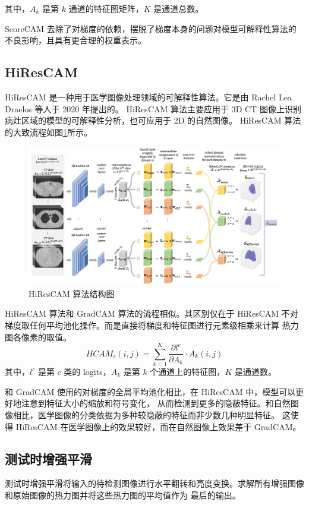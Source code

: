 \documentclass[supercite]{Experimental_Report}
\theoremstyle{definition}
\begin{document}
其中，$A_k$ 是第 $k$ 通道的特征图矩阵，$K$ 是通道总数。

ScoreCAM 去除了对梯度的依赖，摆脱了梯度本身的问题对模型可解释性算法的不良影响，且具有更合理的权重表示。

\subsection{HiResCAM}
HiResCAM\cite{HiResCAM} 是一种用于医学图像处理领域的可解释性算法。它是由 Rachel Lea Draelos 等人于 2020 年提出的。
HiResCAM 算法主要应用于 3D CT 图像上识别病灶区域的模型的可解释性分析，也可应用于 2D 的自然图像。
HiResCAM 算法的大致流程如图\ref{HiResCAM}所示。
\begin{figure}[H]
	\begin{center}
		\includegraphics[scale=0.8]{../images/HiResCAM算法结构图.png}
		\caption{HiResCAM 算法结构图}
		\label{HiResCAM}
	\end{center}
\end{figure}

HiResCAM 算法和 GradCAM 算法的流程相似。其区别仅在于 HiResCAM 不对梯度取任何平均池化操作。而是直接将梯度和特征图进行元素级相乘来计算
热力图各像素的取值。
\begin{equation}
HCAM_c(i,j)=\sum_{k=1}^{K}\frac{\partial l^c}{\partial A_k}\cdot A_k(i,j)
\end{equation}
其中，$l^c$ 是第 $c$ 类的 logits，$A_k$ 是第 $k$ 个通道上的特征图，$K$ 是通道数。

和 GradCAM 使用的对梯度的全局平均池化相比，在 HiResCAM 中，模型可以更好地注意到特征大小的缩放和符号变化，
从而检测到更多的隐蔽特征。和自然图像相比，医学图像的分类依据为多种较隐蔽的特征而非少数几种明显特征。
这使得 HiResCAM 在医学图像上的效果较好，而在自然图像上效果差于 GradCAM。

\subsection{测试时增强平滑}
测试时增强平滑将输入的待检测图像进行水平翻转和亮度变换。求解所有增强图像和原始图像的热力图并将这些热力图的平均值作为
最后的输出。
\end{document}
